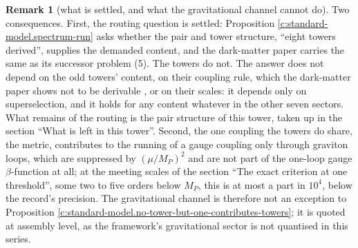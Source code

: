 \documentclass[11pt]{article}
\theoremstyle{definition}
\newtheorem{remark}[theorem]{Remark}
\theoremstyle{plain}
\begin{document}
\begin{remark}[what is settled, and what the gravitational channel cannot do]\label{c:note.standard-model.what-settled-what-gravitational-channel-cannot}
Two consequences. First, the routing question is settled: Proposition \ref{c:standard-model.spectrum-run} asks whether the pair and tower structure, ``eight towers derived'', supplies the demanded content, and the dark-matter paper carries the same as its successor problem (5). The towers do not. The answer does not depend on the odd towers' content, on their coupling rule, which the dark-matter paper shows not to be derivable \cite[Prop.~A.4]{ButlerT14}, or on their scales: it depends only on superselection, and it holds for any content whatever in the other seven sectors. What remains of the routing is the pair structure of this tower, taken up in the section ``What is left in this tower''. Second, the one coupling the towers do share, the metric, contributes to the running of a gauge coupling only through graviton loops, which are suppressed by $(\mu/M_{P})^{2}$ and are not part of the one-loop gauge $\beta$-function at all; at the meeting scales of the section ``The exact criterion at one threshold'', some two to five orders below $M_{P}$, this is at most a part in $10^{4}$, below the record's precision. The gravitational channel is therefore not an exception to Proposition \ref{c:standard-model.no-tower-but-one-contributes-towers}; it is quoted at assembly level, as the framework's gravitational sector is not quantised in this series.
\end{remark}
\end{document}
